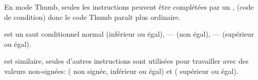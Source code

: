 


En mode Thumb, seules les instructions  peuvent être complétées par un
, (code de condition) donc le code Thumb paraît plus ordinaire.

 est un saut conditionnel normal  (inférieur ou égal),
--- (non égal),
--- (supérieur ou égal).

 est similaire, seules d'autres instructions sont utilisées
pour travailler avec des valeurs non-signées: 
( non signée, inférieur ou égal) et  ( supérieur ou égal).
